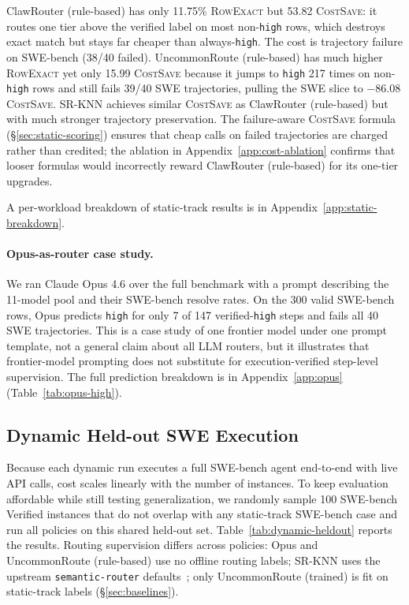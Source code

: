 ClawRouter (rule-based) has only 11.75\% \textsc{RowExact} but 53.82 \textsc{CostSave}:
it routes one tier above the verified label on most non-\texttt{high} rows,
which destroys exact match but stays far cheaper than always-\texttt{high}.
The cost is trajectory failure on SWE-bench (38/40 failed). UncommonRoute
(rule-based) has much higher \textsc{RowExact} yet only 15.99
\textsc{CostSave} because it jumps to \texttt{high} 217 times on
non-\texttt{high} rows and still fails 39/40 SWE trajectories, pulling the
SWE slice to $-86.08$ \textsc{CostSave}. SR-KNN achieves similar
\textsc{CostSave} as ClawRouter (rule-based) but with much stronger trajectory
preservation. The failure-aware \textsc{CostSave} formula
(\S\ref{sec:static-scoring}) ensures that cheap calls on failed trajectories
are charged rather than credited; the ablation in
Appendix~\ref{app:cost-ablation} confirms that looser formulas would
incorrectly reward ClawRouter (rule-based) for its one-tier upgrades.

A per-workload breakdown of static-track results is in
Appendix~\ref{app:static-breakdown}.

\paragraph{Opus-as-router case study.}
\label{sec:opus}

We ran Claude Opus 4.6 over the full benchmark with a prompt describing the
11-model pool and their SWE-bench resolve rates. On the 300 valid SWE-bench
rows, Opus predicts \texttt{high} for only 7 of 147 verified-\texttt{high}
steps and fails all 40 SWE trajectories. This is a case study of one frontier
model under one prompt template, not a general claim about all LLM routers,
but it illustrates that frontier-model prompting does not substitute for
execution-verified step-level supervision. The full prediction breakdown is in
Appendix~\ref{app:opus} (Table~\ref{tab:opus-high}).

\subsection{Dynamic Held-out SWE Execution}
\label{sec:dynamic-results}

Because each dynamic run executes a full SWE-bench agent end-to-end with live
API calls, cost scales linearly with the number of instances. To keep
evaluation affordable while still testing generalization, we randomly sample
100 SWE-bench Verified instances that do not overlap with any static-track
SWE-bench case and run all policies on this shared held-out set.
Table~\ref{tab:dynamic-heldout} reports the results.
Routing supervision differs across policies: Opus and UncommonRoute (rule-based) use no
offline routing labels; SR-KNN uses the upstream \texttt{semantic-router}
defaults~\citep{liu2026vllmsemanticrouter}; only UncommonRoute (trained) is fit
on static-track labels (\S\ref{sec:baselines}).

